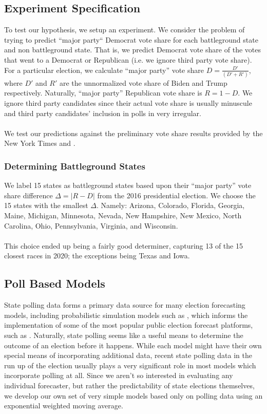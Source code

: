 \subsection{Experiment Specification}
To test our hypothesis, we setup an experiment. We consider the problem of trying to predict ``major party`` Democrat vote share for each battleground state and non battleground state. That is, we predict Democrat vote share of the votes that went to a Democrat or Republican (i.e. we ignore third party vote share). For a particular election, we calculate ``major party'' vote share $D = \frac{D'}{(D' + R')}$, where $D'$ and $R'$ are the unnormalized vote share of Biden and Trump respectively. Naturally, ``major party'' Republican vote share is $R = 1-D$. We ignore third party candidates since their actual vote share is usually minuscule and third party candidates' inclusion in polls in very irregular.
\\~\\
We test our predictions against the preliminary vote share results provided by the New York Times and \cite{scraper}.

\subsubsection{Determining Battleground States}
We label 15 states as battleground states based upon their ``major party'' vote share difference $\Delta = |R - D|$ from the 2016 presidential election. We choose the 15 states with the smallest $\Delta$. Namely: Arizona, Colorado, Florida, Georgia, Maine, Michigan, Minnesota, Nevada, New Hampshire, New Mexico, North Carolina, Ohio, Pennsylvania, Virginia, and Wisconsin.
\\~\\
This choice ended up being a fairly good determiner, capturing 13 of the 15 closest races in 2020; the exceptions being Texas and Iowa.

\subsection{Poll Based Models}
State polling data forms a primary data source for many election forecasting models, including probabilistic simulation models such as \cite{Linzer2013DynamicBF}, which informs the implementation of some of the most popular public election forecast platforms, such as \cite{fivethirtyeight, economist}. Naturally, state polling seems like a useful means to determine the outcome of an election before it happens. While each model might have their own special means of incorporating additional data, recent state polling data in the run up of the election usually plays a very significant role in most models which incorporate polling at all. Since we aren't so interested in evaluating any individual forecaster, but rather the predictability of state elections themselves, we develop our own set of very simple models based only on polling data using an exponential weighted moving average.


